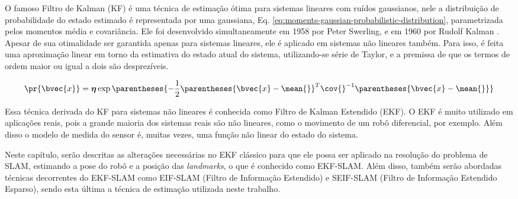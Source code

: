 O famoso Filtro de Kalman (KF) é uma técnica de estimação ótima para sistemas lineares com ruídos gaussianos, nele a distribuição de probabilidade do estado estimado é representada por uma gaussiana, 
Eq. \ref{eq:moments-gaussian-probabilistic-distribution}, parametrizada pelos momentos média e covariância. Ele foi desenvolvido simultaneamente em 1958 por Peter Swerling, e em 1960 por Rudolf Kalman \cite[p.~40]{bongard2006probabilistic}. Apesar de sua otimalidade ser garantida apenas para sistemas lineares, ele é aplicado em sistemas não lineares também. Para isso, é feita uma aproximação linear em torno da estimativa do estado atual do sistema, utilizando-se série de Taylor, e a premissa de que os termos de ordem maior ou igual a dois são desprezíveis.

\begin{equation}
  \pr{\bvec{x}} = \boldsymbol{\eta} \exp\parentheses{-\frac{1}{2} 
  \parentheses{\bvec{x} - \mean{}}^T \cov{}^{-1}\parentheses{\bvec{x} - \mean{}}}
  \label{eq:moments-gaussian-probabilistic-distribution}
\end{equation}

Essa técnica derivada do KF para sistemas não lineares é conhecida como Filtro de Kalman Estendido (EKF). O EKF é muito utilizado em aplicações reais, pois a grande maioria dos sistemas reais são não lineares, como o movimento de um robô diferencial, por exemplo. Além disso o modelo de medida do sensor é, muitas vezes, uma função não linear do estado do sistema.

Neste capítulo, serão descritas as alterações necessárias no EKF clássico para que ele possa ser aplicado na resolução do problema de SLAM, estimando a pose do robô e a posição das \textit{landmarks}, o que é conhecido como EKF-SLAM. Além disso, também serão abordadas técnicas decorrentes do EKF-SLAM como EIF-SLAM (Filtro de Informação Estendido) e SEIF-SLAM (Filtro de Informação Estendido Esparso), sendo esta última a técnica de estimação utilizada neste trabalho.

